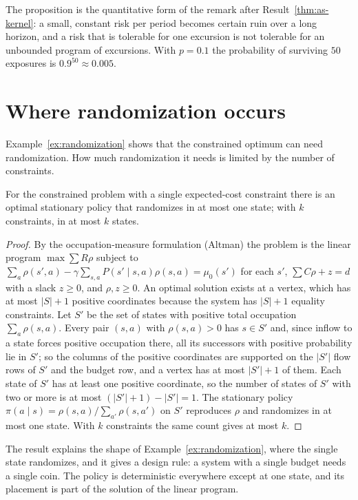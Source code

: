 The proposition is the quantitative form of the remark after Result~\ref{thm:as-kernel}: a small, constant risk per period becomes certain ruin over a long horizon, and a risk that is tolerable for one excursion is not tolerable for an unbounded program of excursions. With $p=0.1$ the probability of surviving $50$ exposures is $0.9^{50}\approx0.005$.

\section{Where randomization occurs}\label{sec:where-random}

Example~\ref{ex:randomization} shows that the constrained optimum can need randomization. How much randomization it needs is limited by the number of constraints.

\begin{newresult}\label{prop:one-random}
For the constrained problem with a single expected-cost constraint there is an optimal stationary policy that randomizes in at most one state; with $k$ constraints, in at most $k$ states.
\end{newresult}
\begin{proof}
By the occupation-measure formulation (Altman) the problem is the linear program $\max\sum R\rho$ subject to $\sum_a\rho(s',a)-\gamma\sum_{s,a}P(s'\mid s,a)\rho(s,a)=\mu_0(s')$ for each $s'$, $\sum C\rho+z=d$ with a slack $z\ge0$, and $\rho,z\ge0$. An optimal solution exists at a vertex, which has at most $|S|+1$ positive coordinates because the system has $|S|+1$ equality constraints. Let $S'$ be the set of states with positive total occupation $\sum_a\rho(s,a)$. Every pair $(s,a)$ with $\rho(s,a)>0$ has $s\in S'$ and, since inflow to a state forces positive occupation there, all its successors with positive probability lie in $S'$; so the columns of the positive coordinates are supported on the $|S'|$ flow rows of $S'$ and the budget row, and a vertex has at most $|S'|+1$ of them. Each state of $S'$ has at least one positive coordinate, so the number of states of $S'$ with two or more is at most $(|S'|+1)-|S'|=1$. The stationary policy $\pi(a\mid s)=\rho(s,a)/\sum_{a'}\rho(s,a')$ on $S'$ reproduces $\rho$ and randomizes in at most one state. With $k$ constraints the same count gives at most $k$.
\end{proof}

The result explains the shape of Example~\ref{ex:randomization}, where the single state randomizes, and it gives a design rule: a system with a single budget needs a single coin. The policy is deterministic everywhere except at one state, and its placement is part of the solution of the linear program.


